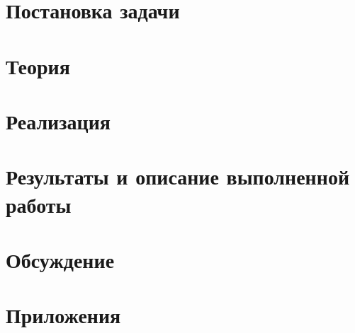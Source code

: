 \documentclass[main.tex]{subfiles}
\begin{document}
\section{Постановка задачи}

\section{Теория}

\section{Реализация}

\section{Результаты и описание выполненной работы}

\section{Обсуждение}

\section{Приложения}

\end{document}
